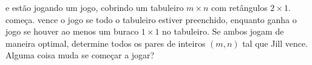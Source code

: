  e  estão jogando um jogo, cobrindo um tabuleiro $m \times n$ com retângulos $2 \times 1$.  começa.  vence o jogo se todo o tabuleiro estiver preenchido, enquanto  ganha o jogo se houver ao menos um buraco $1 \times 1$ no tabuleiro. Se ambos jogam de maneira optimal, determine todos os pares de inteiros $(m, n)$ tal que Jill  vence. Alguma coisa muda se  começar a jogar?